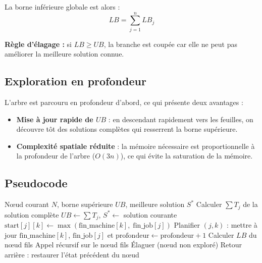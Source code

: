 La borne inférieure globale est alors :
\begin{equation}
    LB = \sum_{j=1}^{n} LB_j
\end{equation}

\textbf{Règle d'élagage :} si $LB \geq UB$, la branche est coupée car elle ne peut pas améliorer la meilleure solution connue.

\subsection{Exploration en profondeur}

L'arbre est parcouru en profondeur d'abord, ce qui présente deux avantages :
\begin{itemize}
    \item \textbf{Mise à jour rapide de $UB$} : en descendant rapidement vers les feuilles, on découvre tôt des solutions complètes qui resserrent la borne supérieure.
    \item \textbf{Complexité spatiale réduite} : la mémoire nécessaire est proportionnelle à la profondeur de l'arbre ($O(3n)$), ce qui évite la saturation de la mémoire.
\end{itemize}

\subsection{Pseudocode}

\begin{algorithm}[H]
\caption{Branch and Bound : exploration récursive}
\begin{algorithmic}[1]
\REQUIRE N\oe ud courant $N$, borne supérieure $UB$, meilleure solution $S^*$
    \STATE Calculer $\sum T_j$ de la solution complète
        \STATE $UB \leftarrow \sum T_j$, \quad $S^* \leftarrow$ solution courante
    \ENDIF
    \RETURN
\ENDIF
{}
    \STATE $\text{start}[j][k] \leftarrow \max(\text{fin\_machine}[k],\; \text{fin\_job}[j])$
    \STATE Planifier $(j,k)$ : mettre à jour $\text{fin\_machine}[k]$, $\text{fin\_job}[j]$ et $\text{profondeur} \leftarrow \text{profondeur} + 1$
    \STATE Calculer $LB$ du n\oe ud fils
        \STATE Appel récursif sur le n\oe ud fils
    \ELSE
        \STATE Élaguer (n\oe ud non exploré)
    \ENDIF
    \STATE Retour arrière : restaurer l'état précédent du n\oe ud
\ENDFOR
\end{algorithmic}
\end{algorithm}

